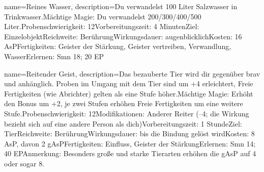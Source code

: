 {
    name={Reines Wasser},
    description={Du verwandelst 100 Liter Salzwasser in Trinkwasser.\newline Mächtige Magie: Du verwandelst 200/300/400/500 Liter.\newline Probenschwierigkeit: 12\newline Vorbereitungszeit: 4 Minuten\newline Ziel: Einzelobjekt\newline Reichweite: Berührung\newline Wirkungsdauer: augenblicklich\newline Kosten: 16 AsP\newline Fertigkeiten: Geister der Stärkung, Geister vertreiben, Verwandlung, Wasser\newline Erlernen: Smn 18; 20 EP}
}


{
    name={Reitender Geist},
    description={Das bezauberte Tier wird dir gegenüber brav und anhänglich. Proben im Umgang mit dem Tier sind um +4 erleichtert, Freie Fertigkeiten (wie Abrichter) gelten als eine Stufe höher.\newline Mächtige Magie: Erhöht den Bonus um +2, je zwei Stufen erhöhen Freie Fertigkeiten um eine weitere Stufe.\newline Probenschwierigkeit: 12\newline Modifikationen: Anderer Reiter (–4; die Wirkung bezieht sich auf eine andere Person als dich)\newline Vorbereitungszeit: 1 Stunde\newline Ziel: Tier\newline Reichweite: Berührung\newline Wirkungsdauer: bis die Bindung gelöst wird\newline Kosten: 8 AsP, davon 2 gAsP\newline Fertigkeiten: Einfluss, Geister der Stärkung\newline Erlernen: Smn 14; 40 EP\newline Anmerkung: Besonders große und starke Tierarten erhöhen die gAsP auf 4 oder sogar 8.}
}


